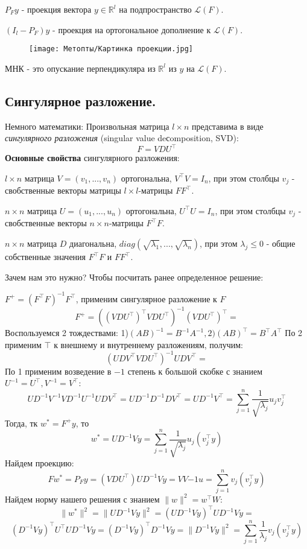 $P_Fy$ - проекция вектора $y \in \mathbb{R}^l$ на подпространство $\mathcal{L}(F)$.

$(I_l - P_F)y$ - проекция на ортогональное дополнение к $\mathcal{L}(F)$.

\begin{figure}[h]
    \centering
    \texttt{[image: Метопты/Картинка проекции.jpg]}
\end{figure}

МНК - это опускание перпендикуляра из $\mathbb{R}^l$ из $y$ на $\mathcal{L}(F)$.
 
\subsection*{Сингулярное разложение.} 

Немного математики:
Произвольная матрица $l \times n$ представима в виде \textit{сингулярного разложения}  (singular value deсomposition, SVD):
$$F = VDU^\top$$
\noindent\textbf{Основные свойства} сингулярного разложения:

$l \times n$ матрица $V = (v_1, ..., v_n)$ ортогональна, $V^\top V = I_n$, при этом столбцы $v_j$ - свобственные векторы матрицы $l \times l$-матрицы $FF^\top$.

$n \times n$ матрица $U = (u_1, ..., u_n)$ ортогональна, $U^\top U = I_n$, при этом столбцы $v_j$ - свобственные векторы $n \times n$-матрицы $F^\top F$.

$n \times n$ матрица $D$ диагональна, $diag(\sqrt{\lambda_1}, ..., \sqrt{\lambda_n})$, при этом $\lambda_j \leq 0$ - общие собственные значения $F^\top F$ и $FF^\top$.

Зачем нам это нужно? Чтобы посчитать ранее определенное решение:

$F^+ = (F^\top F)^{-1}F^\top$, применим сингулярное разложение к $F$
$$F^+ = ((VDU^\top)^\top VDU^\top)^{-1} (VDU^\top)^\top =$$ 
Воспользуемся 2 тождествами: 1)$(AB)^{-1} = B^{-1} A^{-1}, 2) (AB)^{\top} = B^{\top} A^{\top}$
По 2 применим $\top$ к внешнему и внутреннему разложениям, получим:
$$(UDV^\top VDU^\top)^{-1} UDV^\top =$$
По 1 применим возведение в $-1$ степень к большой скобке с знанием $U^{-1} = U^\top, V^{-1} = V^\top$:
$$UD^{-1}V^{-1}VD^{-1}U^{-1} UDV^\top = UD^{-1}D^{-1}DV^\top = UD^{-1}V^\top = \sum_{j = 1}^n \frac{1}{\sqrt{\lambda_j}}u_j v_j^\top$$
Тогда, тк $w^* = F^+ y$, то
$$w^* = UD^{-1}Vy = \sum_{j = 1}^n \frac{1}{\sqrt{\lambda_j}}u_j (v_j^\top y)$$
Найдем проекцию:
$$Fw^* = P_Fy = (VDU^\top) UD^{-1}Vy = VV{-1}u = \sum_{j = 1}^n v_j(v_j^\top y)$$
Найдем норму нашего решения с знанием $\|w\|^2 = w^\top W$:
$$\|w^*\|^2 = \|UD^{-1}Vy\|^2 = (UD^{-1}Vy)^\top UD^{-1}Vy =$$
$$(D^{-1}Vy)^{\top} U^\top UD^{-1}Vy = (D^{-1}Vy)^{\top} D^{-1}Vy = \|D^{-1}Vy\|^2 =  \sum_{j = 1}^n \frac{1}{\lambda_j}v_j(v_j^\top y)$$

